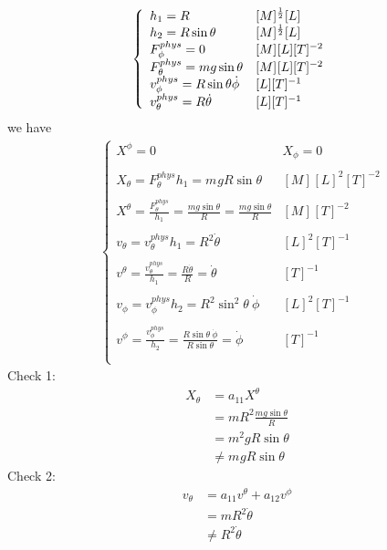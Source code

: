 \begin{align}
&\left\{\begin{array}{ll}
h_1 = R&[M]^{\frac{1}{2}}[L]\\
h_2 = R\sin\theta&[M]^{\frac{1}{2}}[L]\\
F_{\phi}^{phys}= 0&[M]^{}[L][T]^{-2}\\
F_{\theta}^{phys}= mg\sin{\theta}&[M]^{}[L][T]^{-2}\\
v_{\phi}^{phys}= R\sin\theta \dot{\phi}&[L][T]^{-1}\\
v_{\theta}^{phys}= R \dot{\theta}&[L][T]^{-1}\\
\end{array}\right.
\end{align}
we have 
\begin{align}
&\left\{\begin{array}{ll}
X^{\phi}= 0&X_{\phi}= 0\\\\
X_{\theta} = F_{\theta}^{phys}{h_1} = m^{}gR\sin{\theta}&[M]^{}[L]^2[T]^{-2}\\\\
X^{\theta} = \frac{F_{\theta}^{phys}}{h_1} = \frac{mg\sin{\theta}}{R}=\frac{mg\sin{\theta}}{R}&[M]^{}[T]^{-2}\\\\
v_{\theta} = v_{\theta}^{phys}{h_1} = R^2 \dot{\theta}&[L]^2[T]^{-1}\\\\
v^{\theta} = \frac{v_{\theta}^{phys}}{h_1} = \frac{ R \dot{\theta}}{R}=\dot{\theta}&[T]^{-1}\\\\
v_{\phi} = v_{\phi}^{phys}{h_2} = R^2\sin^2\theta \  \dot{\phi}&[L]^2[T]^{-1}\\\\
v^{\phi} = \frac{v_{\phi}^{phys}}{h_2} = \frac{ R \sin\theta \ \dot{\phi}}{R\sin\theta}=\dot{\phi}&[T]^{-1}\\\\
\end{array}\right.
\end{align}
Check 1:
\begin{align}
X_{\theta} &= a_{11}X^{\theta}\\
&= mR^2\frac{{m}g\sin{\theta}}{R}\\
&= m^{2}gR\sin{\theta}\\
&\neq m^{}gR\sin{\theta}
\end{align}
Check 2:
\begin{align}
v_{\theta} &= a_{11}v^{\theta}+ a_{12}v^{\phi}\\
&= mR^2\dot{\theta}\\
&\neq R^2\dot{\theta}
\end{align}
